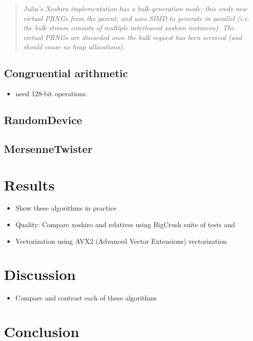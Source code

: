 \documentclass{article}
\begin{document}
            \begin{quote}

                \textit{Julia's Xoshiro implementation has a bulk-generation mode; this seeds new virtual PRNGs from the parent, and uses SIMD to generate in parallel (i.e. the bulk stream consists of multiple interleaved xoshiro instances). The virtual PRNGs are discarded once the bulk request has been serviced (and should cause no heap allocations).}
            \end{quote}

        \subsection*{Congruential arithmetic}

            \begin{itemize}
                \item need 128-bit operations.
            \end{itemize}

        \subsection*{RandomDevice}
        
        \subsection*{MersenneTwister}

    \section*{Results}

        \begin{itemize}
            \item Show these algorithms in practice
            \item Quality\cite{shootout}: Compare xoshiro and relatives using BigCrush suite of tests \cite{TestU01} and \cite{HammingWeightDependencies}
            \item Vectorization using AVX2 (Advanced Vector Extensions) vectorization \cite{shootout}
        \end{itemize}

    \section*{Discussion}

        \begin{itemize}
            \item Compare and contrast each of these algorithms
        \end{itemize}

    \section*{Conclusion}

    \printbibliography
\end{document}
